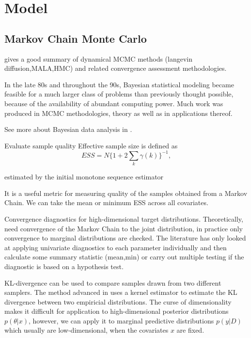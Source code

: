 \documentclass[12pt]{report}
\begin{document}
\chapter{Model}

\section{Markov Chain Monte Carlo}




\cite{green2015bayesian} gives a good summary of dynamical MCMC methods (langevin diffusion,MALA,HMC) and related convergence assessment methodologies.

In the late 80s and throughout the 90s, Bayesian statistical modeling became
feasible for a much larger class of problems than previously thought possible,
because of the availability of abundant computing power. Much work was produced
in MCMC methodologies\cite{robert2013monte}, theory\cite{tierney1994markov,roberts2004general} as well as in applications thereof.  



See more about Bayesian data analysis in \cite{gelman2014bayesian}. 


Evaluate sample quality
Effective sample size is defined as 
\[ ESS = N \{ 1 + 2 \sum_k \gamma(k) \}^{-1}, \]

estimated by the initial
monotone sequence estimator \cite{geyer1992practical}

It is a useful metric for measuring quality of the samples obtained from a
Markov Chain. We can take the mean or minimum ESS across all covariates.

Convergence diagnostics for high-dimensional target distributions. Theoretically, need convergence of the Markov Chain to the joint distribution, in practice only convergence to marginal distributions are checked. The literature has only looked at applying univariate diagnostics to each parameter individually and then calculate some summary statistic (mean,min) or carry out multiple testing if the diagnostic is based on a hypothesis test.

KL-divergence can be used to compare samples drawn from two different samplers.
The method advanced in \cite{boltz2007knn,boltz2007high} uses a kernel estimator to estimate the KL divergence between two empiricial distributions. The curse of dimensionality makes it difficult for application to high-dimensional posterior distributions $p(\theta|x)$, however, we can apply it to marginal predictive distributions $p(y|D)$ which usually are low-dimensional, when the covariates $x$ are fixed.
\end{document}
